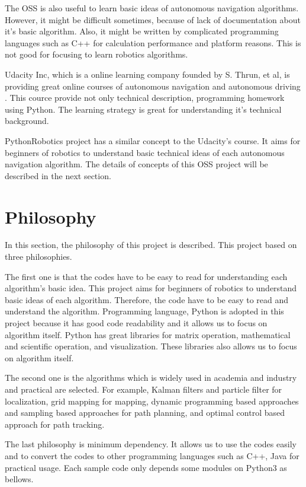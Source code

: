 \documentclass{bmvc2k}
\begin{document}
The OSS is also useful to learn basic ideas of autonomous navigation algorithms.
However, it might be difficult sometimes, because of lack of documentation about it's basic algorithm.
Also, it might be written by complicated programming languages such as C++ for calculation performance and platform reasons.
This is not good for focusing to learn robotics algorithms.

Udacity Inc, which is a online learning company founded by S. Thrun, et al, is providing great online courses of autonomous navigation and autonomous driving \cite{udacity}.
This cource provide not only technical description, programming homework using Python.
The learning strategy is great for understanding it's technical background.

PythonRobotics project has a similar concept to the Udacity's course.
It aims for beginners of robotics to understand basic technical ideas of each autonomous navigation algorithm.
The details of concepts of this OSS project will be described in the next section. 

\section{Philosophy}
In this section, the philosophy of this project is described.
This project based on three philosophies.

The first one is that the codes have to be easy to read for understanding each algorithm's basic idea.
This project aims for beginners of robotics to understand basic ideas of each algorithm. 
Therefore, the code have to be easy to read and understand the algorithm.
Programming language, Python\cite{python} is adopted in this project because it has good code readability and it allows us to focus on algorithm itself.
Python has great libraries for matrix operation, mathematical and scientific operation, and visualization.
These libraries also allows us to focus on algorithm itself.

The second one is the algorithms which is widely used in academia and industry and practical are selected.
For example, Kalman filters and particle filter for localization, grid mapping for mapping, dynamic programming based approaches and sampling based approaches for path planning, and optimal control based approach for path tracking.

The last philosophy is minimum dependency.
It allows us to use the codes easily and to convert the codes to other programming languages such as C++, Java for practical usage.
Each sample code only depends some modules on Python3 as bellows.
\end{document}
